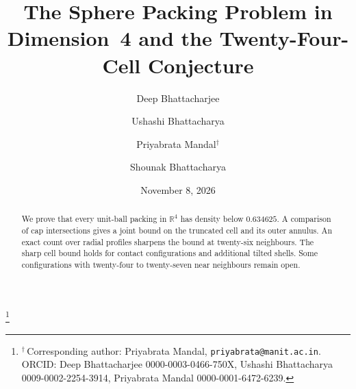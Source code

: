 \documentclass[11pt,reqno]{amsart}
\renewcommand{\_}{\origunderscore\allowbreak}
\numberwithin{equation}{section}
\theoremstyle{plain}
\theoremstyle{definition}
\theoremstyle{remark}
\begin{document}
\title[Sphere packing in dimension four]{The Sphere Packing Problem in
Dimension~4 and the Twenty-Four-Cell Conjecture}

\author[D. Bhattacharjee]{Deep Bhattacharjee}
\address{Formerly, Electro-Gravitational Space Propulsion Laboratory (EGSPL),
Bhubaneswar, Odisha 751030, India}
\thanks{$^{\dag}$\,Corresponding author: Priyabrata Mandal,
\texttt{priyabrata@manit.ac.in}.
ORCID: Deep Bhattacharjee 0000-0003-0466-750X,
Ushashi Bhattacharya 0009-0002-2254-3914,
Priyabrata Mandal 0000-0001-6472-6239.}

\author[U. Bhattacharya]{Ushashi Bhattacharya}
\address{Formerly, National Taiwan University, Taipei 106319, Taiwan}

\author[P. Mandal]{Priyabrata Mandal$^{\dag}$}
\address{Department of Mathematics, Bioinformatics and Computer Applications,
Maulana Azad National Institute of Technology Bhopal, Bhopal 462003, India}

\author[S. Bhattacharya]{Shounak Bhattacharya}
\address{Research Head, Asian College of Teachers, Kolkata, West Bengal, India}

\date{November 8, 2026}




\begin{abstract}
We prove that every unit-ball packing in $\mathbb R^4$ has density below
$0.634625$. A comparison of cap intersections gives a joint bound on the
truncated cell and its outer annulus. An exact count over radial profiles
sharpens the bound at twenty-six neighbours. The sharp cell bound holds
for contact configurations and additional tilted shells. Some configurations
with twenty-four to twenty-seven near neighbours remain open.
\end{abstract}

\maketitle
\end{document}
